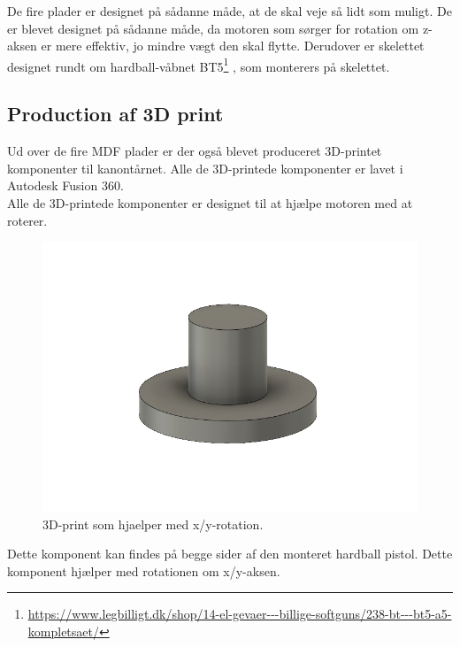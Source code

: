 De fire plader er designet på sådanne måde, at de skal veje så lidt som muligt. De er blevet designet på sådanne måde, da motoren som sørger for rotation om z-aksen er mere effektiv, jo mindre vægt den skal flytte. Derudover er skelettet designet rundt om hardball-våbnet BT5\footnote{\url{https://www.legbilligt.dk/shop/14-el-gevaer---billige-softguns/238-bt---bt5-a5-kompletsaet/}} , som monterers på skelettet. 

\subsection{Production af 3D print}
Ud over de fire MDF plader er der også blevet produceret 3D-printet komponenter til kanontårnet. Alle de 3D-printede komponenter er lavet i Autodesk Fusion 360. \\

Alle de 3D-printede komponenter er designet til at hjælpe motoren med at roterer. \\

\begin{figure}[H]
\centering
\includegraphics[scale=0.4]{Billeder/3D_print_1.PNG}
\caption{3D-print som hjaelper med x/y-rotation.}
\label{fig:3D_print_1}
\end{figure}

Dette komponent kan findes på begge sider af den monteret hardball pistol. Dette komponent hjælper med rotationen om x/y-aksen. \\

